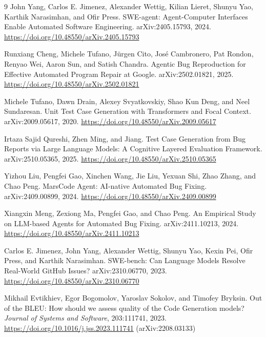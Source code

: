 \documentclass[12pt]{article}
\begin{document}
\begin{thebibliography}{9}
John Yang, Carlos E. Jimenez, Alexander Wettig, Kilian Lieret, Shunyu Yao, Karthik Narasimhan, and Ofir Press.
\newblock SWE-agent: Agent-Computer Interfaces Enable Automated Software Engineering.
\newblock arXiv:2405.15793, 2024. \url{https://doi.org/10.48550/arXiv.2405.15793}

Runxiang Cheng, Michele Tufano, J\"urgen Cito, Jos\'e Cambronero, Pat Rondon, Renyao Wei, Aaron Sun, and Satish Chandra.
\newblock Agentic Bug Reproduction for Effective Automated Program Repair at Google.
\newblock arXiv:2502.01821, 2025. \url{https://doi.org/10.48550/arXiv.2502.01821}

Michele Tufano, Dawn Drain, Alexey Svyatkovskiy, Shao Kun Deng, and Neel Sundaresan.
\newblock Unit Test Case Generation with Transformers and Focal Context.
\newblock arXiv:2009.05617, 2020. \url{https://doi.org/10.48550/arXiv.2009.05617}

Irtaza Sajid Qureshi, Zhen Ming, and Jiang.
\newblock Test Case Generation from Bug Reports via Large Language Models: A Cognitive Layered Evaluation Framework.
\newblock arXiv:2510.05365, 2025. \url{https://doi.org/10.48550/arXiv.2510.05365}

Yizhou Liu, Pengfei Gao, Xinchen Wang, Jie Liu, Yexuan Shi, Zhao Zhang, and Chao Peng.
\newblock MarsCode Agent: AI-native Automated Bug Fixing.
\newblock arXiv:2409.00899, 2024. \url{https://doi.org/10.48550/arXiv.2409.00899}

Xiangxin Meng, Zexiong Ma, Pengfei Gao, and Chao Peng.
\newblock An Empirical Study on LLM-based Agents for Automated Bug Fixing.
\newblock arXiv:2411.10213, 2024. \url{https://doi.org/10.48550/arXiv.2411.10213}

Carlos E. Jimenez, John Yang, Alexander Wettig, Shunyu Yao, Kexin Pei, Ofir Press, and Karthik Narasimhan.
\newblock SWE-bench: Can Language Models Resolve Real-World GitHub Issues?
\newblock arXiv:2310.06770, 2023. \url{https://doi.org/10.48550/arXiv.2310.06770}

Mikhail Evtikhiev, Egor Bogomolov, Yaroslav Sokolov, and Timofey Bryksin.
\newblock Out of the BLEU: How should we assess quality of the Code Generation models?
\newblock \emph{Journal of Systems and Software}, 203:111741, 2023.
\newblock \url{https://doi.org/10.1016/j.jss.2023.111741} (arXiv:2208.03133)


\end{thebibliography}
\end{document}
